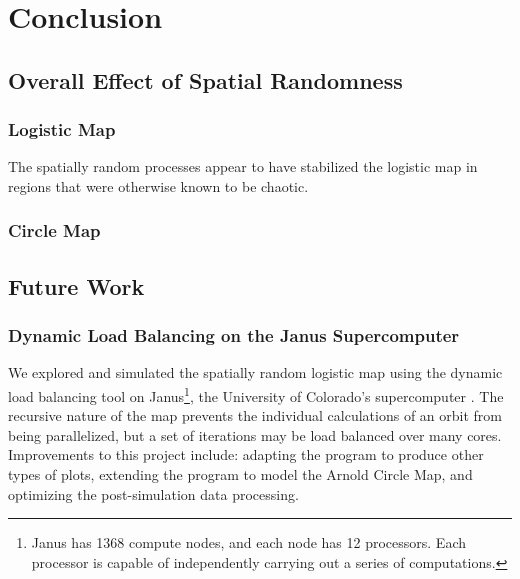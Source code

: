 \chapter{Conclusion}
\section{Overall Effect of Spatial Randomness}
\subsection{Logistic Map}
The spatially random processes appear to have stabilized the logistic
map in regions that were otherwise known to be chaotic.
\subsection{Circle Map}

\section{Future Work}
\subsection{Dynamic Load Balancing on the Janus Supercomputer}
We explored and simulated the spatially random logistic map using the
dynamic load balancing tool on Janus\footnote{Janus has 1368 compute nodes, and
  each node has 12 processors. Each processor is capable of
  independently carrying
  out a series of computations.}, the University of Colorado's supercomputer
\cite{janus}. The recursive nature of the map prevents the individual
calculations of an orbit from being parallelized, but a set of
iterations may be load balanced over many
cores. Improvements to this project include: adapting the program to
produce other types of plots, extending the program to model
the Arnold Circle Map, and optimizing the post-simulation data processing. 

